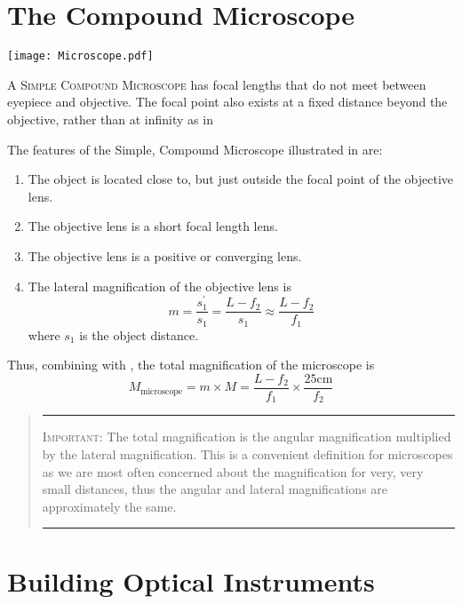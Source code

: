 \section{The Compound Microscope}

\begin{marginfigure}
  \texttt{[image: Microscope.pdf]}
  \caption[Compound Microscope]{\textsc{A Simple Compound Microscope} has focal lengths that do not meet between eyepiece and objective.  The focal point also exists at a fixed distance beyond the objective, rather than at infinity as in }
  \label{f:mscope}
\end{marginfigure}

The features of the Simple, Compound Microscope illustrated in  are:
\begin{enumerate}
	\item The object is located close to, but just outside the focal point of the objective lens.
	\item The objective lens is a short focal length lens.
	\item The objective lens is a positive or converging lens. 
	\item The lateral magnification of the objective lens is
	\begin{equation}
		m = \frac{s^{\prime}_{1}}{s_{1}}=\frac{L-f_2 }{s_{1}}\approx \frac{L-f_{2}}{f_1}
		\label{e:objective-mag}
	\end{equation}
	where $s_{1}$ is the object distance.
\end{enumerate}

Thus, combining  with , the total magnification of the microscope is
\begin{equation} \label{e:mscope}
	M_{\textrm{microscope}} = m \times M = \frac{L-f_{2}}{f_1}\times\frac{25\textrm{cm}}{f_2}
\end{equation}

\begin{quote}\hrule
\textsc{Important:} The total magnification is the angular magnification multiplied by the lateral magnification.  This is a convenient definition for microscopes as we are most often concerned about the magnification for very, very small distances, thus the angular and lateral magnifications are approximately the same.\\[-0.5em]
\hrule
\end{quote}

\section{Building Optical Instruments}
